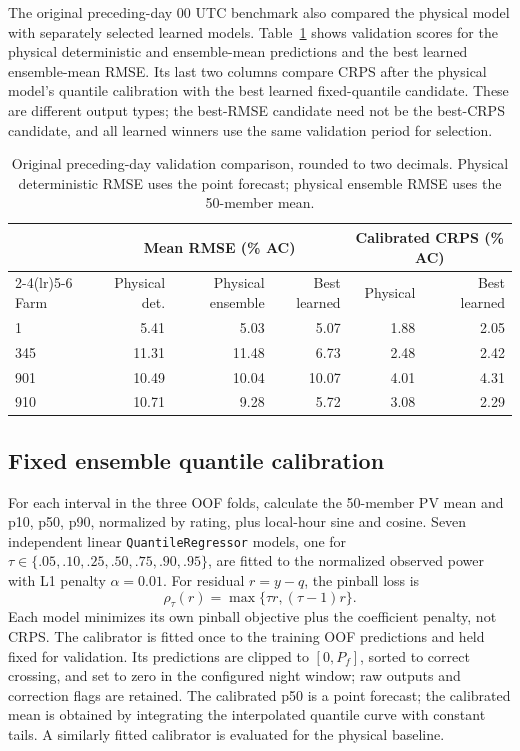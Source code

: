 \documentclass[11pt,a4paper]{article}
\begin{document}
The original preceding-day 00 UTC benchmark also compared the physical model with separately selected learned models. Table~\ref{tab:baseline} shows validation scores for the physical deterministic and ensemble-mean predictions and the best learned ensemble-mean RMSE. Its last two columns compare CRPS after the physical model's quantile calibration with the best learned fixed-quantile candidate. These are different output types; the best-RMSE candidate need not be the best-CRPS candidate, and all learned winners use the same validation period for selection.
\begin{table}[H]\centering\small
\begin{tabular}{lrrrrr}\toprule
 & \multicolumn{3}{c}{Mean RMSE (\% AC)} & \multicolumn{2}{c}{Calibrated CRPS (\% AC)}\\
\cmidrule(lr){2-4}\cmidrule(lr){5-6}
Farm & Physical det. & Physical ensemble & Best learned & Physical & Best learned\\\midrule
1 & 5.41 & 5.03 & 5.07 & 1.88 & 2.05\\
345 & 11.31 & 11.48 & 6.73 & 2.48 & 2.42\\
901 & 10.49 & 10.04 & 10.07 & 4.01 & 4.31\\
910 & 10.71 & 9.28 & 5.72 & 3.08 & 2.29\\
\bottomrule\end{tabular}\caption{Original preceding-day validation comparison, rounded to two decimals. Physical deterministic RMSE uses the point forecast; physical ensemble RMSE uses the 50-member mean.}\label{tab:baseline}\end{table}

\subsection{Fixed ensemble quantile calibration}\label{sec:fixedquantiles}
For each interval in the three OOF folds, calculate the 50-member PV mean and p10, p50, p90, normalized by rating, plus local-hour sine and cosine. Seven independent linear \texttt{QuantileRegressor} models, one for $\tau\in\{.05,.10,.25,.50,.75,.90,.95\}$, are fitted to the normalized observed power with L1 penalty $\alpha=0.01$. For residual $r=y-q$, the pinball loss is
\begin{equation}\rho_{\tau}(r)=\max\{\tau r,(\tau-1)r\}.\end{equation}
Each model minimizes its own pinball objective plus the coefficient penalty, not CRPS. The calibrator is fitted once to the training OOF predictions and held fixed for validation. Its predictions are clipped to $[0,P_f]$, sorted to correct crossing, and set to zero in the configured night window; raw outputs and correction flags are retained. The calibrated p50 is a point forecast; the calibrated mean is obtained by integrating the interpolated quantile curve with constant tails. A similarly fitted calibrator is evaluated for the physical baseline.
\end{document}
